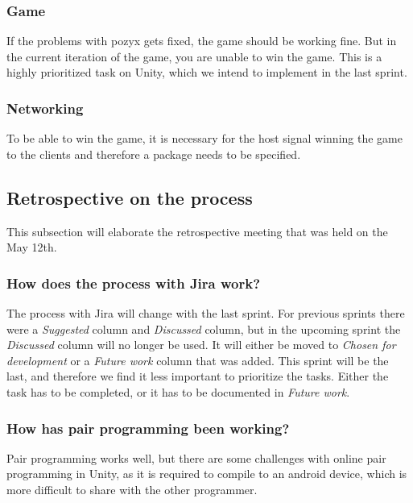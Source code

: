 \subsubsection{Game}
If the problems with pozyx gets fixed, the game should be working fine.
But in the current iteration of the game, you are unable to win the game.
This is a highly prioritized task on Unity, which we intend to implement in the last sprint.

\subsubsection{Networking}
To be able to win the game, it is necessary for the host signal winning the game to the clients and therefore a package needs to be specified.

\subsection{Retrospective on the process}
This subsection will elaborate the retrospective meeting that was held on the May 12th.

\subsubsection*{How does the process with Jira work?}
The process with Jira will change with the last sprint.
For previous sprints there were a \textit{Suggested} column and \textit{Discussed} column, but in the upcoming sprint the \textit{Discussed} column will no longer be used.
It will either be moved to \textit{Chosen for development} or a \textit{Future work} column that was added.
This sprint will be the last, and therefore we find it less important to prioritize the tasks.
Either the task has to be completed, or it has to be documented in \textit{Future work}.

\subsubsection*{How has pair programming been working?}
Pair programming works well, but there are some challenges with online pair programming in Unity, as it is required to compile to an android device, which is more difficult to share with the other programmer.

